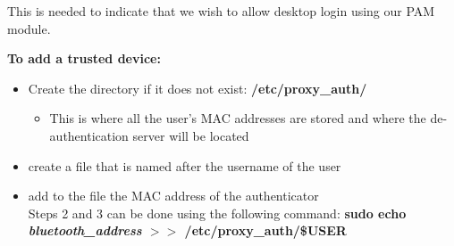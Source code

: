\documentclass[letterpaper,twocolumn,10pt]{article}
\begin{document}
This is needed to indicate that we wish to allow desktop login using our PAM module.

\textbf{To add a trusted device:}
\begin{itemize}[noitemsep]
\item Create the directory if it does not exist: \textbf{/etc/proxy\_auth/}
\begin{itemize}[noitemsep]
\item This is where all the user's MAC addresses are stored and where the de-authentication server will be located
\end{itemize}
\item create a file that is named after the username of the user
\item add to the file the MAC address of the authenticator\\
Steps 2 and 3 can be done using the following command: \textbf{sudo echo \emph{bluetooth\_address} $>>$ /etc/proxy\_auth/\$USER}
\end{itemize}
\end{document}
